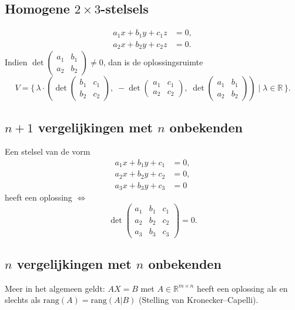 \documentclass[a5paper]{article}
\begin{document}
\subsection{Homogene $2\times 3$-stelsels}
\begin{align*}
a_1 x + b_1 y + c_1 z &= 0, \\
a_2 x + b_2 y + c_2 z &= 0.
\end{align*}
Indien $\det\!\begin{pmatrix} a_1 & b_1 \\ a_2 & b_2 \end{pmatrix}\neq0$, dan is de oplossingsruimte
\[
V = \{\, \lambda \cdot (\det\!\begin{pmatrix} b_1 & c_1 \\ b_2 & c_2 \end{pmatrix}, \;
          -\det\!\begin{pmatrix} a_1 & c_1 \\ a_2 & c_2 \end{pmatrix}, \;
           \det\!\begin{pmatrix} a_1 & b_1 \\ a_2 & b_2 \end{pmatrix}) \mid \lambda\in\mathbb{R}\,\}.
\]

\subsection{$n+1$ vergelijkingen met $n$ onbekenden}
Een stelsel van de vorm
\begin{align*}
a_1 x + b_1 y + c_1 &= 0,\\
a_2 x + b_2 y + c_2 &= 0,\\
a_3 x + b_3 y + c_3 &= 0
\end{align*}
heeft een oplossing $\Leftrightarrow$
\[
\det \begin{pmatrix}
a_1 & b_1 & c_1 \\
a_2 & b_2 & c_2 \\
a_3 & b_3 & c_3
\end{pmatrix}=0.
\]

\subsection{$n$ vergelijkingen met $n$ onbekenden}
Meer in het algemeen geldt: $AX=B$ met $A\in\mathbb{R}^{m\times n}$ heeft een oplossing als en slechts als $\mathrm{rang}(A)=\mathrm{rang}(A|B)$ (Stelling van Kronecker–Capelli).
\end{document}
